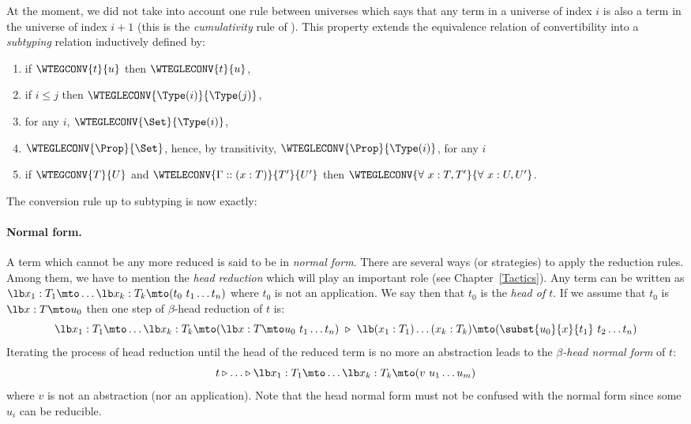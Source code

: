 At the moment, we did not take into account one rule between universes
which says that any term in a universe of index $i$ is also a term in
the universe of index $i+1$ (this is the {\em cumulativity} rule of
{\CIC}). This property extends the equivalence relation of
convertibility into a {\em subtyping} relation inductively defined by:
\begin{enumerate}
\item if $\WTEGCONV{t}{u}$ then $\WTEGLECONV{t}{u}$,
\item if $i \leq j$ then $\WTEGLECONV{\Type(i)}{\Type(j)}$,
\item for any $i$, $\WTEGLECONV{\Set}{\Type(i)}$,
\item $\WTEGLECONV{\Prop}{\Set}$, hence, by transitivity,
  $\WTEGLECONV{\Prop}{\Type(i)}$, for any $i$
\item if $\WTEGCONV{T}{U}$ and $\WTELECONV{\Gamma::(x:T)}{T'}{U'}$ then $\WTEGLECONV{\forall~x:T, T'}{\forall~x:U, U'}$.
\end{enumerate}

The conversion rule up to subtyping is now exactly:

\begin{description}\label{Conv}
\item[Conv]
  \end{description}


\paragraph[Normal form.]{Normal form.\label{Normal-form}\label{Head-normal-form}}
A term which cannot be any more reduced is said to be in {\em normal
  form}. There are several ways (or strategies) to apply the reduction
rules. Among them, we have to mention the {\em head reduction} which
will play an important role (see Chapter~\ref{Tactics}). Any term can
be written as $\lb x_1:T_1\mto \ldots \lb x_k:T_k \mto
(t_0\ t_1\ldots t_n)$ where
$t_0$ is not an application. We say then that $t_0$ is the {\em head
  of $t$}. If we assume that $t_0$ is $\lb x:T\mto u_0$ then one step of
$\beta$-head reduction of $t$ is:
\[\lb x_1:T_1\mto \ldots \lb x_k:T_k\mto (\lb x:T\mto u_0\ t_1\ldots t_n)
~\triangleright ~ \lb (x_1:T_1)\ldots(x_k:T_k)\mto
(\subst{u_0}{x}{t_1}\ t_2 \ldots t_n)\]
Iterating the process of head reduction until the head of the reduced
term is no more an abstraction leads to the {\em $\beta$-head normal
  form} of $t$:
\[ t \triangleright \ldots \triangleright
\lb x_1:T_1\mto \ldots\lb x_k:T_k\mto (v\ u_1
\ldots u_m)\]
where $v$ is not an abstraction (nor an application).  Note that the
head normal form must not be confused with the normal form since some
$u_i$ can be reducible.

